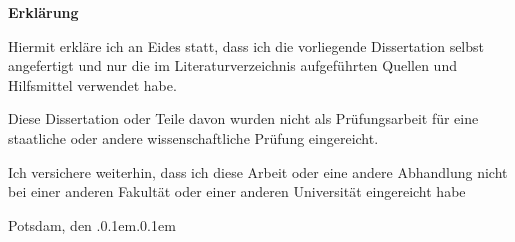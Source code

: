 \vfill {\centering \textbf{Erklärung}} 

\vspace{3ex}

{\centering Hiermit erkläre ich an Eides statt, dass ich die vorliegende Dissertation selbst angefertigt und nur die im Literaturverzeichnis aufgeführten Quellen und Hilfsmittel verwendet habe.}

\vspace{2ex}

{\centering Diese Dissertation oder Teile davon wurden nicht als Prüfungsarbeit für eine staatliche oder andere wissenschaftliche Prüfung eingereicht. }

\vspace{2ex}

{\centering Ich versichere weiterhin, dass ich diese Arbeit oder eine andere Abhandlung nicht bei einer anderen Fakultät oder einer anderen Universität eingereicht habe}

\vspace{9ex}

{\centering Potsdam, den \the\day.\kern0.1em\the\month.\kern0.1em\the\year}

\vspace{9ex}

{\centering
\makeatletter
\@author
\makeatother}

